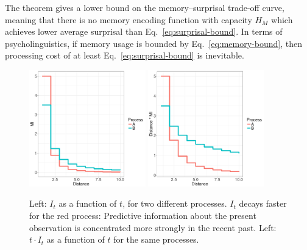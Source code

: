 The theorem gives a lower bound on the memory--surprisal trade-off curve, meaning that there is no memory encoding function with capacity $H_M$ which achieves lower average surprisal than Eq.~\ref{eq:surprisal-bound}. In terms of psycholinguistics, if memory usage is bounded by Eq.~\ref{eq:memory-bound}, then processing cost of at least Eq.~\ref{eq:surprisal-bound} is inevitable.

\begin{figure}
\includegraphics[width=0.45\textwidth]{figures/decay.pdf}
\includegraphics[width=0.45\textwidth]{figures/memory.pdf}
%
	\caption{Left: $I_t$ as a function of $t$, for two different processes. $I_t$ decays faster for the red process: Predictive information about the present observation is concentrated more strongly in the recent past. Left: $t \cdot I_t$ as a function of $t$ for the same processes.  }\label{fig:basic}
\end{figure}

